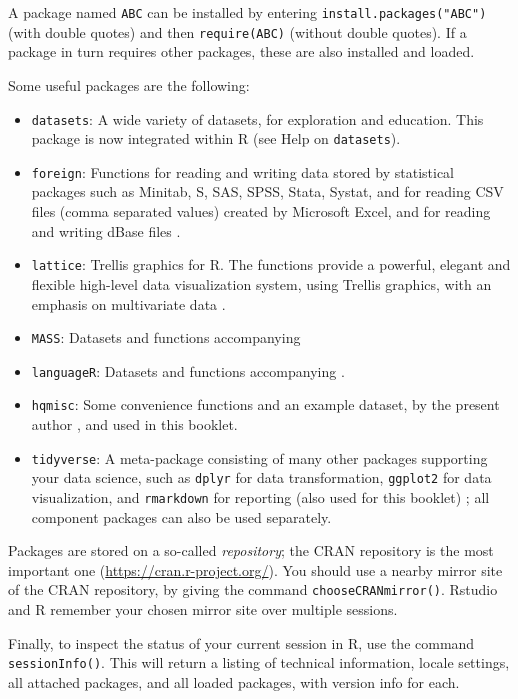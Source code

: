 \documentclass[
]{book}
\begin{document}
A package named \texttt{ABC} can be installed by
entering \texttt{install.packages("ABC")} (with double quotes) and then \texttt{require(ABC)} (without double quotes).
If a package in turn requires other packages, these are also installed
and loaded.

Some useful packages are the following:

\begin{itemize}
\item
  \texttt{datasets}: A wide
  variety of datasets, for exploration and education. This
  package is now integrated within R (see Help on \texttt{datasets}).
\item
  \texttt{foreign}: Functions for reading and writing data stored by statistical
  packages such as Minitab, S, SAS, SPSS, Stata, Systat, and for
  reading CSV files (comma separated values) created by Microsoft
  Excel, and for reading and writing dBase files \citep{R-foreign}.
\item
  \texttt{lattice}: Trellis graphics for R. The functions provide a
  powerful, elegant and flexible high-level data visualization system,
  using Trellis graphics, with an emphasis on multivariate data \citep{R-lattice}.
\item
  \texttt{MASS}: Datasets and functions accompanying \citep{VR02, R-MASS}
\item
  \texttt{languageR}: Datasets and functions accompanying \citep{baay08, R-languageR}.
\item
  \texttt{hqmisc}: Some convenience functions and an example dataset, by the present author \citep{R-hqmisc}, and used in this booklet.
\item
  \texttt{tidyverse}: A meta-package consisting of many other packages supporting your data science, such as \texttt{dplyr} for data transformation, \texttt{ggplot2} for data visualization, and \texttt{rmarkdown} for reporting (also used for this booklet) \citep{tidy19}; all component packages can also be used separately.
\end{itemize}

Packages are stored on a so-called \emph{repository}; the CRAN repository is
the most important one (\url{https://cran.r-project.org/}).
You should use a nearby mirror site of the CRAN
repository, by giving the command \texttt{chooseCRANmirror()}.
Rstudio and R remember your chosen mirror site over multiple sessions.

Finally, to inspect the status of your current session in R, use the command \texttt{sessionInfo()}. This will return a listing of technical information, locale settings, all attached packages, and all loaded packages, with version info for each.
\end{document}
